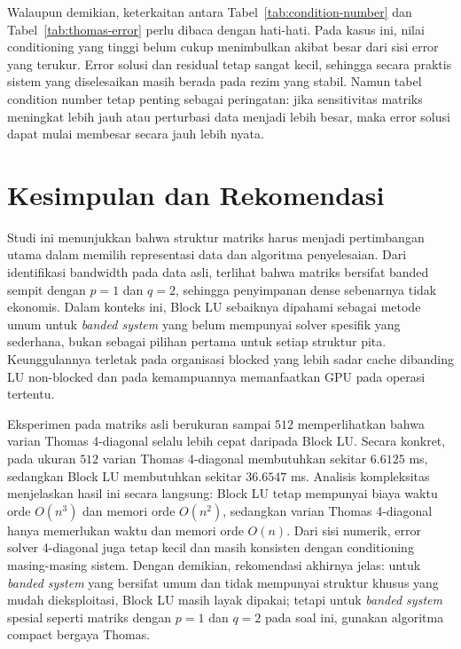 \documentclass[12pt,a4paper]{article}
\begin{document}
Walaupun demikian, keterkaitan antara Tabel~\ref{tab:condition-number} dan Tabel~\ref{tab:thomas-error} perlu dibaca dengan hati-hati. Pada kasus ini, nilai conditioning yang tinggi belum cukup menimbulkan akibat besar dari sisi error yang terukur. Error solusi dan residual tetap sangat kecil, sehingga secara praktis sistem yang diselesaikan masih berada pada rezim yang stabil. Namun tabel condition number tetap penting sebagai peringatan: jika sensitivitas matriks meningkat lebih jauh atau perturbasi data menjadi lebih besar, maka error solusi dapat mulai membesar secara jauh lebih nyata.

\section{Kesimpulan dan Rekomendasi}
Studi ini menunjukkan bahwa struktur matriks harus menjadi pertimbangan utama dalam memilih representasi data dan algoritma penyelesaian. Dari identifikasi bandwidth pada data asli, terlihat bahwa matriks bersifat banded sempit dengan $p=1$ dan $q=2$, sehingga penyimpanan dense sebenarnya tidak ekonomis. Dalam konteks ini, Block LU sebaiknya dipahami sebagai metode umum untuk \emph{banded system} yang belum mempunyai solver spesifik yang sederhana, bukan sebagai pilihan pertama untuk setiap struktur pita. Keunggulannya terletak pada organisasi blocked yang lebih sadar cache dibanding LU non-blocked dan pada kemampuannya memanfaatkan GPU pada operasi tertentu.

Eksperimen pada matriks asli berukuran sampai $512$ memperlihatkan bahwa varian Thomas 4-diagonal selalu lebih cepat daripada Block LU. Secara konkret, pada ukuran $512$ varian Thomas 4-diagonal membutuhkan sekitar $6.6125$ ms, sedangkan Block LU membutuhkan sekitar $36.6547$ ms. Analisis kompleksitas menjelaskan hasil ini secara langsung: Block LU tetap mempunyai biaya waktu orde $O(n^3)$ dan memori orde $O(n^2)$, sedangkan varian Thomas 4-diagonal hanya memerlukan waktu dan memori orde $O(n)$. Dari sisi numerik, error solver 4-diagonal juga tetap kecil dan masih konsisten dengan conditioning masing-masing sistem. Dengan demikian, rekomendasi akhirnya jelas: untuk \emph{banded system} yang bersifat umum dan tidak mempunyai struktur khusus yang mudah dieksploitasi, Block LU masih layak dipakai; tetapi untuk \emph{banded system} spesial seperti matriks dengan $p=1$ dan $q=2$ pada soal ini, gunakan algoritma compact bergaya Thomas.
\end{document}
